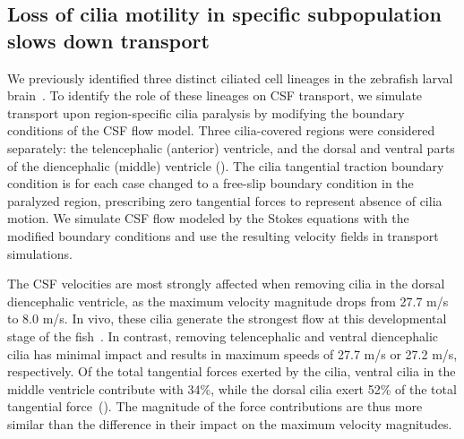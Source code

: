 \documentclass{WileyMSP-template}
\begin{document}
\subsection{Loss of cilia motility in specific subpopulation slows down transport}
We previously identified three distinct ciliated cell lineages in the
zebrafish larval brain~\cite{Olstad2019CiliaryDevelopment, DGama2025MotileBrain}.
To identify the role of these lineages on CSF transport, we simulate transport
upon region-specific cilia paralysis by modifying the boundary conditions
of the CSF flow model. Three cilia-covered regions were considered separately:
the telencephalic (anterior) ventricle, and the dorsal and ventral parts
of the diencephalic (middle) ventricle ().
The cilia tangential traction boundary condition is for each case
changed to a free-slip boundary condition in the paralyzed region,
prescribing zero tangential forces to
represent absence of cilia motion.
We simulate CSF flow modeled by the Stokes equations with the
modified boundary conditions and use the resulting
velocity fields in transport simulations.

The CSF velocities are most strongly
affected when removing cilia in the dorsal diencephalic ventricle,
as the maximum velocity magnitude drops from 27.7 \textmu m/s to 8.0 \textmu m/s.
In vivo, these cilia generate the strongest flow at
this developmental stage of the fish~\cite{Olstad2019CiliaryDevelopment}.
In contrast, removing telencephalic and ventral diencephalic cilia has minimal
impact and results in maximum speeds of 27.7 \textmu m/s or 27.2 \textmu m/s, respectively.
Of the total tangential forces exerted by the cilia, ventral cilia in the middle ventricle
contribute with 34\%, while the dorsal cilia exert 52\% of the total tangential
force~(). The magnitude of the force contributions are thus
more similar than the difference in their impact on the maximum velocity magnitudes.
\end{document}

